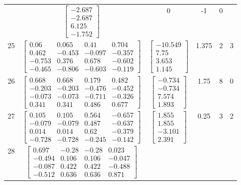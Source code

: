 \documentclass[a4paper,12pt]{article}
\begin{document}
\begin{tabular}{c c c c c c}
&
$\begin{bmatrix} -2.687 \\ -2.687 \\ 6.125 \\ -1.752 \end{bmatrix}$
&
0
&
-1
&
0
\\
25
&
$\begin{bmatrix} 0.06 & 0.065 & 0.41 & 0.704 \\ 0.462 & -0.453 & -0.097 & -0.357 \\ -0.753 & 0.376 & 0.678 & -0.602 \\ -0.465 & -0.806 & -0.603 & -0.119 \end{bmatrix}$
&
$\begin{bmatrix} -10.549 \\ 7.75 \\ 3.653 \\ 1.145 \end{bmatrix}$
&
1.375
&
2
&
3
\\
26
&
$\begin{bmatrix} 0.668 & 0.668 & 0.179 & 0.482 \\ -0.203 & -0.203 & -0.476 & -0.452 \\ -0.073 & -0.073 & -0.711 & -0.326 \\ 0.341 & 0.341 & 0.486 & 0.677 \end{bmatrix}$
&
$\begin{bmatrix} -0.734 \\ -0.734 \\ 7.574 \\ 1.893 \end{bmatrix}$
&
1.75
&
8
&
0
\\
27
&
$\begin{bmatrix} 0.105 & 0.105 & 0.564 & -0.657 \\ -0.079 & -0.079 & 0.487 & -0.637 \\ 0.014 & 0.014 & 0.62 & -0.379 \\ -0.728 & -0.728 & -0.245 & -0.142 \end{bmatrix}$
&
$\begin{bmatrix} 1.855 \\ 1.855 \\ -3.101 \\ 2.391 \end{bmatrix}$
&
0.25
&
3
&
2
\\
28
&
$\begin{bmatrix} 0.697 & -0.28 & -0.28 & 0.023 \\ -0.494 & 0.106 & 0.106 & -0.047 \\ -0.087 & 0.422 & 0.422 & -0.488 \\ -0.512 & 0.636 & 0.636 & 0.871 \end{bmatrix}$

\end{tabular}
\end{document}

